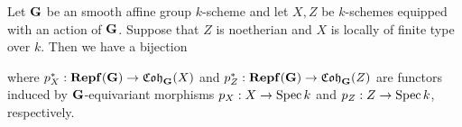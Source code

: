 \begin{corollary}\label{corollary:equivariant_morphisms_from_categories_Rydh_version}
Let $\mathbf{G}$ be an smooth affine group $k$-scheme and let $X,Z$ be $k$-schemes equipped with an action of $\mathbf{G}$. Suppose that $Z$ is noetherian and $X$ is locally of finite type over $k$. Then we have a bijection
\begin{center}
\end{center}
where $p_X^*:\mathbf{Repf}(\mathbf{G})\rightarrow \mathfrak{Coh}_{\mathbf{G}}(X)$ and $p_Z^*:\mathbf{Repf}(\mathbf{G})\rightarrow \mathfrak{Coh}_{\mathbf{G}}(Z)$ are functors induced by $\mathbf{G}$-equivariant morphisms $p_X:X\rightarrow \mathrm{Spec}\, k$ and $p_Z:Z\rightarrow \mathrm{Spec}\, k$, respectively.
\end{corollary}
